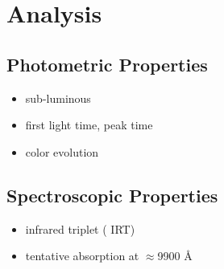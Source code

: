 \documentclass[twocolumn]{aastex631}
\begin{document}
\section{Analysis} \label{sec:analysis}
\subsection{Photometric Properties}
\begin{itemize}
    \item sub-luminous
    \item first light time, peak time
    \item color evolution
\end{itemize}

\subsection{Spectroscopic Properties}
\begin{itemize}
    \item infrared  triplet ( IRT)
    \item tentative  absorption at $\approx$9900 \r{A}
\end{itemize}
\end{document}
